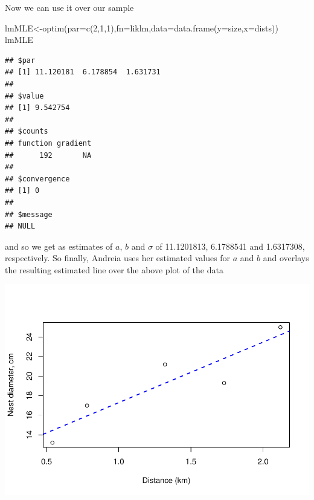 \documentclass[
]{book}
\newenvironment{Shaded}{\begin{snugshade}}{\end{snugshade}}
\newcommand{\AttributeTok}[1]{\textcolor[rgb]{0.77,0.63,0.00}{#1}}
\newcommand{\DecValTok}[1]{\textcolor[rgb]{0.00,0.00,0.81}{#1}}
\newcommand{\FunctionTok}[1]{\textcolor[rgb]{0.00,0.00,0.00}{#1}}
\newcommand{\NormalTok}[1]{#1}
\newcommand{\OtherTok}[1]{\textcolor[rgb]{0.56,0.35,0.01}{#1}}
\newcommand{\SpecialCharTok}[1]{\textcolor[rgb]{0.00,0.00,0.00}{#1}}
\newcommand{\StringTok}[1]{\textcolor[rgb]{0.31,0.60,0.02}{#1}}
\begin{document}
Now we can use it over our sample

\begin{Shaded}
\begin{Highlighting}[]
\NormalTok{lmMLE}\OtherTok{\textless{}{-}}\FunctionTok{optim}\NormalTok{(}\AttributeTok{par=}\FunctionTok{c}\NormalTok{(}\DecValTok{2}\NormalTok{,}\DecValTok{1}\NormalTok{,}\DecValTok{1}\NormalTok{),}\AttributeTok{fn=}\NormalTok{liklm,}\AttributeTok{data=}\FunctionTok{data.frame}\NormalTok{(}\AttributeTok{y=}\NormalTok{size,}\AttributeTok{x=}\NormalTok{dists))}
\NormalTok{lmMLE}
\end{Highlighting}
\end{Shaded}

\begin{verbatim}
## $par
## [1] 11.120181  6.178854  1.631731
## 
## $value
## [1] 9.542754
## 
## $counts
## function gradient 
##      192       NA 
## 
## $convergence
## [1] 0
## 
## $message
## NULL
\end{verbatim}

and so we get as estimates of \(a\), \(b\) and \(\sigma\) of 11.1201813, 6.1788541 and 1.6317308, respectively. So finally, Andreia uses her estimated values for \(a\) and \(b\) and overlays the resulting estimated line over the above plot of the data

\begin{Shaded}
\end{Shaded}

\includegraphics{ECOMODbook_files/figure-latex/ch13.29-1.pdf}
\end{document}
